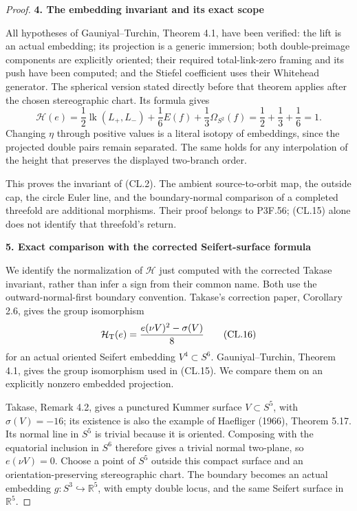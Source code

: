\begin{proof}
\par

\medskip\noindent\textbf{4. The embedding invariant and its exact scope}

\par\nobreak

All hypotheses of Gauniyal--Turchin, Theorem 4.1, have been verified:
the lift is an actual embedding; its projection is a generic immersion;
both double-preimage components are explicitly oriented; their required
total-link-zero framing and its push have been computed; and the
Stiefel coefficient uses their Whitehead generator. The spherical
version stated directly before that theorem applies after the chosen
stereographic chart. Its formula gives
\[
 \mathcal H(e)
   =\frac12\operatorname{lk}(L_+,L_-)
      +\frac16E(f)+\frac13\Omega_{S^2}(f)
   =\frac12+\frac13+\frac16=1.                                  \tag{CL.15}
\]
Changing \(\eta\) through positive values is a literal isotopy of
embeddings, since the projected double pairs remain separated.
The same holds for any interpolation of the height that preserves
the displayed two-branch order.

This proves the invariant of (CL.2). The ambient source-to-orbit map,
the outside cap, the circle Euler line, and the boundary-normal
comparison of a completed threefold are additional morphisms.
Their proof belongs to P3F.56; (CL.15) alone does not identify that
threefold's return.

\par

\medskip\noindent\textbf{5. Exact comparison with the corrected Seifert-surface formula}

\par\nobreak

We identify the normalization of \(\mathcal H\) just computed with
the corrected Takase invariant, rather than infer a sign from their
common name. Both use the outward-normal-first boundary convention.
Takase's correction paper, Corollary 2.6, gives the group isomorphism
\[
 \mathcal H_{\rm T}(e)
      =\frac{e(\nu V)^2-\sigma(V)}8                 \tag{CL.16}
\]
for an actual oriented Seifert embedding \(V^4\subset S^6\).
Gauniyal--Turchin, Theorem 4.1, gives the group isomorphism used in
(CL.15). We compare them on an explicitly nonzero embedded projection.

Takase, Remark 4.2, gives a punctured Kummer surface
\(V\subset S^5\), with \(\sigma(V)=-16\); its existence is
also the example of Haefliger (1966), Theorem 5.17. Its normal line
in \(S^5\) is trivial because it is oriented. Composing with the
equatorial inclusion in \(S^6\) therefore gives a trivial normal
two-plane, so \(e(\nu V)=0\). Choose a point of \(S^5\) outside
this compact surface and an orientation-preserving stereographic
chart. The boundary becomes an actual embedding
\(g:S^3\hookrightarrow\mathbb R^5\), with empty double locus,
and the same Seifert surface in \(\mathbb R^5\).


\end{proof}
